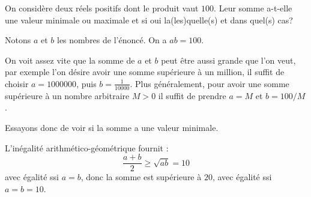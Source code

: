 \begin{comment}
\begin{exo}[Une inégalité]
 
Soient $a$ et $b$ deux réels.
Montrer que $ab \leq \frac{a^2}{4}+b^2$.
Généraliser.
 

\begin{sol} 
On applique l'inégalité arithmético-géométrique à $\frac{a^2}{4}$ et à $b^2$, ce qui donne
\[
\frac{a^2}{4}+ b^2
\geq
2\sqrt{\frac{a^2}{4}\cdot b^2} = |ab| \geq ab.
\]

On peut généraliser en remplaçant $4$ par un réel strictement positif. Une formulation est la suivante. Pour $a$ et $b$ réels et $\lambda>0$, on a 
\[
2|ab|  \leq \frac{a^2}{\lambda}+ \lambda b^2.
\]
\end{sol}  
\end{exo}
\end{comment}


\begin{exo}
 
On considère deux réels positifs dont le produit vaut $100$. Leur somme a-t-elle une valeur minimale ou maximale et si oui la(les)quelle(s) et dans quel(s) cas?

\begin{sol} 
Notons $a$ et $b$ les nombres de l'énoncé. On a $ab=100$.

On voit assez vite que la somme de $a$ et $b$ peut être aussi grande que l'on veut, par exemple l'on désire avoir une somme supérieure à un million, il suffit de choisir $a=1000000$, puis  $b=\frac{1}{10000}$. Plus généralement, pour avoir une somme supérieure à un nombre arbitraire $M>0$ il suffit de prendre $a=M$ et $b=100/M$.

Essayons donc de voir si la somme a une valeur minimale.

L'inégalité arithmético-géométrique fournit :
\[ \frac{a+b}{2}\geq \sqrt{ab}=10\]
avec égalité ssi $a=b$, donc la somme est supérieure à $20$, avec égalité ssi $a=b=10$.
\end{sol}  
\end{exo}



